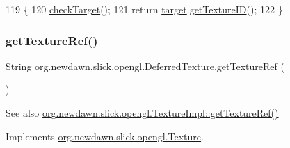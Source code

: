 \begin{DoxyCode}
119                               \{
120         \mbox{\hyperlink{classorg_1_1newdawn_1_1slick_1_1opengl_1_1_deferred_texture_a22f14bcd9cbd4bf033e2308b90464dce}{checkTarget}}();
121         \textcolor{keywordflow}{return} \mbox{\hyperlink{classorg_1_1newdawn_1_1slick_1_1opengl_1_1_deferred_texture_aa70a4b195d0b965a0099d0e7bc18d9d2}{target}}.\mbox{\hyperlink{classorg_1_1newdawn_1_1slick_1_1opengl_1_1_texture_impl_a5f9635744122138ab81a37fe44a8bcdc}{getTextureID}}();
122     \}
\end{DoxyCode}
\mbox{\label{classorg_1_1newdawn_1_1slick_1_1opengl_1_1_deferred_texture_a063653545f11f5af27c1fdbcc25cf540}} 
\subsubsection{\texorpdfstring{get\+Texture\+Ref()}{getTextureRef()}}
{\footnotesize\ttfamily String org.\+newdawn.\+slick.\+opengl.\+Deferred\+Texture.\+get\+Texture\+Ref (\begin{DoxyParamCaption}{ }\end{DoxyParamCaption})\hspace{0.3cm}{\ttfamily [inline]}}

\begin{DoxySeeAlso}{See also}
\mbox{\hyperlink{classorg_1_1newdawn_1_1slick_1_1opengl_1_1_texture_impl_a9d766e8c7e6ac8197f358066cfe418e5}{org.\+newdawn.\+slick.\+opengl.\+Texture\+Impl\+::get\+Texture\+Ref()}} 
\end{DoxySeeAlso}


Implements \mbox{\hyperlink{interfaceorg_1_1newdawn_1_1slick_1_1opengl_1_1_texture_a3082bf984c663ac388b9f5d1dc0d0074}{org.\+newdawn.\+slick.\+opengl.\+Texture}}.


